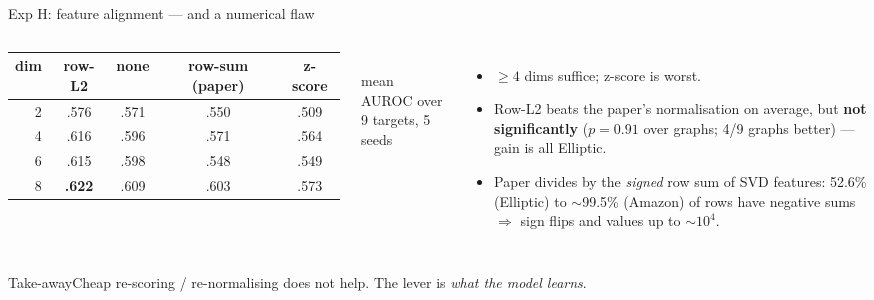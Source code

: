 \documentclass[aspectratio=169,11pt]{beamer}
\begin{document}
\begin{frame}{Exp H: feature alignment --- and a numerical flaw}
\begin{columns}[T]
\centering\scriptsize
\begin{tabular}{rcccc}
\toprule
dim & row-L2 & none & row-sum (paper) & z-score\\ \midrule
2 & .576 & .571 & .550 & .509\\
4 & .616 & .596 & .571 & .564\\
6 & .615 & .598 & .548 & .549\\
8 & \textbf{.622} & .609 & .603 & .573\\ \bottomrule
\end{tabular}\\[4pt]
\scriptsize mean AUROC over 9 targets, 5 seeds
\begin{itemize}\small
\item $\ge4$ dims suffice; z-score is worst.
\item Row-L2 beats the paper's normalisation on average, but \textbf{not significantly} ($p=0.91$ over graphs; 4/9 graphs better) --- gain is all Elliptic.
\item Paper divides by the \emph{signed} row sum of SVD features: 52.6\% (Elliptic) to $\sim$99.5\% (Amazon) of rows have negative sums $\Rightarrow$ sign flips and values up to $\sim10^4$.
\end{itemize}
\end{columns}
\vspace{4pt}
\begin{block}{Take-away}\small Cheap re-scoring / re-normalising does not help. The lever is \emph{what the model learns}.\end{block}
\end{frame}
\end{document}
